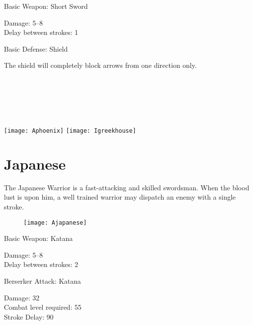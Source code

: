 Basic Weapon: Short Sword
\begin{adjustwidth}{1cm}{}
	Damage: 5–8 \\
	Delay between strokes: 1
\end{adjustwidth}
Basic Defense: Shield
\begin{adjustwidth}{1cm}{}
	The shield will completely block arrows from one direction only. \\ \\ \\ \\ \\ \\
\end{adjustwidth}

\begin{center}
	\texttt{[image: Aphoenix]} \hspace{1pt}\texttt{[image: Igreekhouse]}
\end{center}

\clearpage

\section{Japanese}


The Japanese Warrior is a fast-attacking and skilled swordsman. When the blood lust is upon him, a well trained warrior may dispatch an enemy with a single stroke.

\begin{wrapfigure}{r}{0.5\textwidth}
	\begin{center}
		\vspace{-20pt}
		\texttt{[image: Ajapanese]}
	\end{center}
	\vspace{-40pt}
\end{wrapfigure}

Basic Weapon: Katana
\begin{adjustwidth}{1cm}{}
	Damage: 5–8 \\
	Delay between strokes: 2
\end{adjustwidth}
Berserker Attack: Katana
\begin{adjustwidth}{1cm}{}
	Damage: 32 \\
	Combat level required: 55 \\
	Stroke Delay: 90 \\ \\ \\ \\ \\ \\ \\ \\ \\
\end{adjustwidth}

